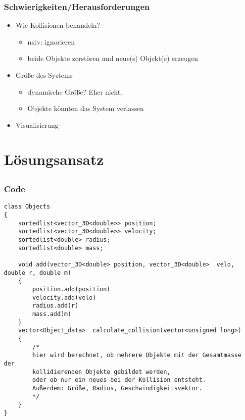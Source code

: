 \documentclass{beamer}
\begin{document}

\begin{frame}
    \frametitle{Schwierigkeiten/Herausforderungen}
    \begin{itemize}
        \item Wie Kollisionen behandeln?
            \begin{itemize}
                \item naiv: ignorieren
                \item beide Objekte zerstören und neue(s) Objekt(e) erzeugen
            \end{itemize}
        \item Größe des Systems
            \begin{itemize}
                \item dynamische Größe? Eher nicht.
                \item Objekte könnten das System verlassen
            \end{itemize}
        \item Visualisierung
    \end{itemize}
\end{frame}


\section{Lösungsansatz}
\subsection{}


\begin{frame}[fragile]
    \frametitle{Code}
    \begin{verbatim}
class Objects
{
    sortedlist<vector_3D<double>> position;
    sortedlist<vector_3D<double>> velocity;
    sortedlist<double> radius;
    sortedlist<double> mass;

    void add(vector_3D<double> position, vector_3D<double>  velo, double r, double m)
    {
        position.add(position)
        velocity.add(velo)
        radius.add(r)
        mass.add(m)
    }
    vector<Object_data>  calculate_collision(vector<unsigned long>)
    {
        /*
        hier wird berechnet, ob mehrere Objekte mit der Gesamtmasse der
        kollidierenden Objekte gebildet werden,
        oder ob nur ein neues bei der Kollision entsteht.
        Außerdem: Größe, Radius, Geschwindigkeitsvektor.
        */
    }
}
    \end{verbatim}
\end{frame}
\end{document}
